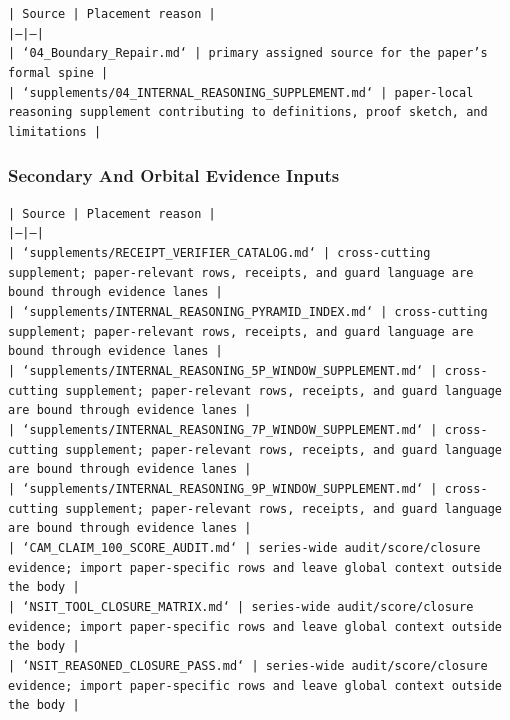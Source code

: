 \documentclass[11pt]{article}
\begin{document}
\noindent\texttt{| Source | Placement reason |}\\
\noindent\texttt{|---|---|}\\
\noindent\texttt{| `04\_Boundary\_Repair.md` | primary assigned source for the paper's formal spine |}\\
\noindent\texttt{| `supplements/04\_INTERNAL\_REASONING\_SUPPLEMENT.md` | paper-local reasoning supplement contributing to definitions, proof sketch, and limitations |}\\

\subsubsection*{Secondary And Orbital Evidence Inputs}

\noindent\texttt{| Source | Placement reason |}\\
\noindent\texttt{|---|---|}\\
\noindent\texttt{| `supplements/RECEIPT\_VERIFIER\_CATALOG.md` | cross-cutting supplement; paper-relevant rows, receipts, and guard language are bound through evidence lanes |}\\
\noindent\texttt{| `supplements/INTERNAL\_REASONING\_PYRAMID\_INDEX.md` | cross-cutting supplement; paper-relevant rows, receipts, and guard language are bound through evidence lanes |}\\
\noindent\texttt{| `supplements/INTERNAL\_REASONING\_5P\_WINDOW\_SUPPLEMENT.md` | cross-cutting supplement; paper-relevant rows, receipts, and guard language are bound through evidence lanes |}\\
\noindent\texttt{| `supplements/INTERNAL\_REASONING\_7P\_WINDOW\_SUPPLEMENT.md` | cross-cutting supplement; paper-relevant rows, receipts, and guard language are bound through evidence lanes |}\\
\noindent\texttt{| `supplements/INTERNAL\_REASONING\_9P\_WINDOW\_SUPPLEMENT.md` | cross-cutting supplement; paper-relevant rows, receipts, and guard language are bound through evidence lanes |}\\
\noindent\texttt{| `CAM\_CLAIM\_100\_SCORE\_AUDIT.md` | series-wide audit/score/closure evidence; import paper-specific rows and leave global context outside the body |}\\
\noindent\texttt{| `NSIT\_TOOL\_CLOSURE\_MATRIX.md` | series-wide audit/score/closure evidence; import paper-specific rows and leave global context outside the body |}\\
\noindent\texttt{| `NSIT\_REASONED\_CLOSURE\_PASS.md` | series-wide audit/score/closure evidence; import paper-specific rows and leave global context outside the body |}\\
\end{document}
